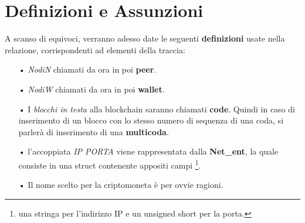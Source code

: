 \section{Definizioni e Assunzioni}
A scanso di equivoci, verranno adesso date le seguenti \textbf{definizioni} usate nella relazione, corrispondenti ad elementi della traccia:
\begin{itemize}
\item[•] \textit{NodiN} chiamati da ora in poi \textbf{peer}.

\item[•] \textit{NodiW} chiamati da ora in poi \textbf{wallet}.

\item[•] I \textit{blocchi in testa} alla blockchain saranno chiamati \textbf{code}. Quindi in caso di inserimento di un blocco  con lo stesso numero di sequenza di una coda, si parlerà di inserimento di una \textbf{multicoda}.
\item[•] l'accoppiata \textit{IP PORTA} viene rappresentata dalla \textbf{Net\_ent}, la quale consiste in una struct contenente appositi campi \footnote{una stringa per l'indirizzo IP e un unsigned short per la porta.}.
\item[•] Il nome scelto per la criptomoneta è \textbf{\vitcoin} per ovvie ragioni.
\end{itemize}
 
